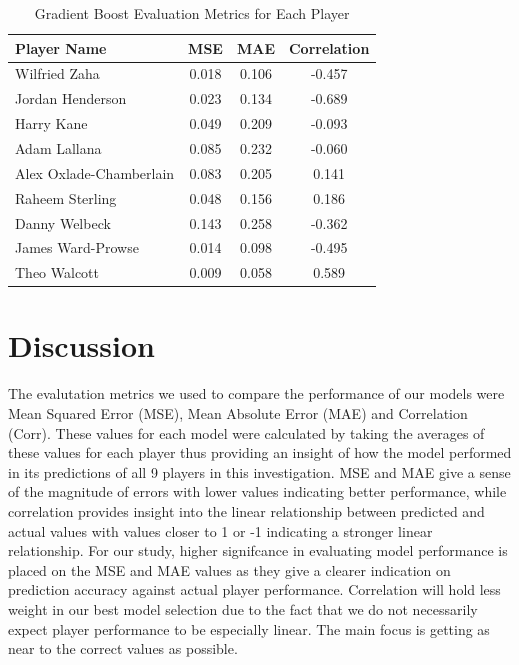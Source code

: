 \documentclass[12pt]{article}
\begin{document}
\begin{table}[H]
  \centering
  \begin{tabular}{|l|c|c|c|}
  \hline
  \textbf{Player Name} & \textbf{MSE} & \textbf{MAE} & \textbf{Correlation} \\
  \hline
  Wilfried Zaha & 0.018 & 0.106 & -0.457 \\
  Jordan Henderson & 0.023 & 0.134 & -0.689 \\
  Harry Kane & 0.049 & 0.209 & -0.093 \\
  Adam Lallana & 0.085 & 0.232 & -0.060 \\
  Alex Oxlade-Chamberlain & 0.083 & 0.205 & 0.141 \\
  Raheem Sterling & 0.048 & 0.156 & 0.186 \\
  Danny Welbeck & 0.143 & 0.258 & -0.362 \\
  James Ward-Prowse & 0.014 & 0.098 & -0.495 \\
  Theo Walcott & 0.009 & 0.058 & 0.589 \\
  \hline
  \end{tabular}
  \caption{Gradient Boost Evaluation Metrics for Each Player}
  \label{tab:player_evaluation_metrics}
\end{table}






\section{Discussion}
\label{sec:disc}




The evalutation 
metrics we used to compare the performance of our models were Mean Squared Error
(MSE), Mean Absolute Error (MAE) and Correlation (Corr). These values for each 
model were calculated by taking the averages of these values for each player
thus providing an insight of how the model performed in its predictions of all 
9 players in this investigation. MSE and MAE give a sense of the magnitude
of errors with lower values indicating better performance, while correlation
provides insight into the linear relationship between predicted and actual values
with values closer to 1 or -1 indicating a stronger linear relationship.
For our study, higher signifcance in evaluating model performance is placed on
the MSE and MAE values as they give a clearer indication on prediction accuracy 
against actual player performance. Correlation will hold less weight in 
our best model selection due to the fact that we do not necessarily expect player 
performance to be especially linear. The main focus is getting as near to the 
correct values as possible.
\end{document}
